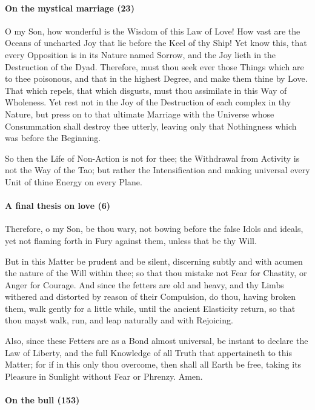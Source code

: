 \paragraph{On the mystical marriage (23)}


O my Son, how wonderful is the Wisdom of this Law of Love! How vast are the Oceans of uncharted Joy that lie before the Keel of thy Ship! Yet know this, that every Opposition is in its Nature named Sorrow, and the Joy lieth in the Destruction of the Dyad. Therefore, must thou seek ever those Things which are to thee poisonous, and that in the highest Degree, and make them thine by Love. That which repels, that which disgusts, must thou assimilate in this Way of Wholeness. Yet rest not in the Joy of the Destruction of each complex in thy Nature, but press on to that ultimate Marriage with the Universe whose Consummation shall destroy thee utterly, leaving only that Nothingness which was before the Beginning.

So then the Life of Non-Action is not for thee; the Withdrawal from Activity is not the Way of the Tao; but rather the Intensification and making universal every Unit of thine Energy on every Plane.

\paragraph{A final thesis on love (6)}


Therefore, o my Son, be thou wary, not bowing before the false Idols and ideals, yet not flaming forth in Fury against them, unless that be thy Will.

But in this Matter be prudent and be silent, discerning subtly and with acumen the nature of the Will within thee; so that thou mistake not Fear for Chastity, or Anger for Courage. And since the fetters are old and heavy, and thy Limbs withered and distorted by reason of their Compulsion, do thou, having broken them, walk gently for a little while, until the ancient Elasticity return, so that thou mayst walk, run, and leap naturally and with Rejoicing.

Also, since these Fetters are as a Bond almost universal, be instant to declare the Law of Liberty, and the full Knowledge of all Truth that appertaineth to this Matter; for if in this only thou overcome, then shall all Earth be free, taking its Pleasure in Sunlight without Fear or Phrenzy. Amen.

\paragraph{On the bull (153)}


